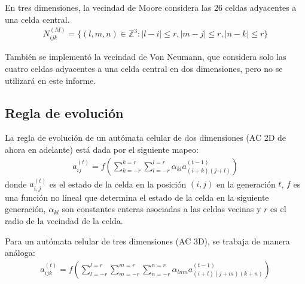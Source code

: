 En tres dimensiones, la vecindad de Moore considera las 26 celdas adyacentes a una celda central.
\begin{equation}
    \label{eq:moore_neighborhood_3d}
    \begin{aligned}
        N^{(M)}_{ijk} = \{(l,m,n) \in \mathbb{Z}^3 : |l-i| \leq r, |m-j| \leq r, |n-k| \leq r\}
    \end{aligned}
\end{equation}

También se implementó la vecindad de Von Neumann, que considera solo las cuatro celdas adyacentes a una celda central en dos dimensiones, pero no se utilizará en este informe.




\subsection{Regla de evolución}
La regla de evolución de un autómata celular de dos dimensiones (AC 2D de ahora en adelante) está dada por el siguiente mapeo:
\begin{equation}
    \label{eq:evolution_rule}
    \begin{aligned}
        a_{ij}^{(t)} = f(\sum^{k=r}_{k=-r}\sum^{l=r}_{l=-r}{\alpha_{kl}a_{(i+k)(j+l)}^{(t-1)}})
    \end{aligned}
\end{equation}
donde $a_{i,j}^{(t)}$ es el estado de la celda en la posición $(i,j)$ en la generación $t$, $f$ es una función no lineal que determina el estado de la celda en la siguiente generación, $\alpha_{kl}$ son constantes enteras asociadas a las celdas vecinas y $r$ es el radio de la vecindad de la celda.


Para un autómata celular de tres dimensiones (AC 3D), se trabaja de manera análoga:
\begin{equation}
    \label{eq:evolution_rule_3d}
    \begin{aligned}
        a_{ijk}^{(t)} = f(\sum^{l=r}_{l=-r}\sum^{m=r}_{m=-r}\sum^{n=r}_{n=-r}{\alpha_{lmn}a_{(i+l)(j+m)(k+n)}^{(t-1)}})
    \end{aligned}
\end{equation}